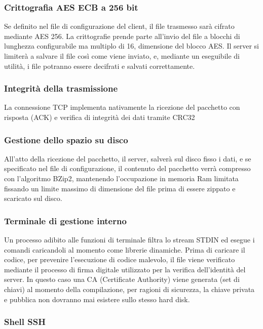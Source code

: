 \subsubsection*{Crittografia A\+ES E\+CB a 256 bit}

Se definito nel file di configurazione del client, il file trasmesso sarà cifrato mediante A\+ES 256. La crittografie prende parte all’invio del file a blocchi di lunghezza configurabile ma multiplo di 16, dimensione del blocco A\+ES. Il server si limiterà a salvare il file così come viene inviato, e, mediante un eseguibile di utilità, i file potranno essere decifrati e salvati correttamente. \subsubsection*{Integrità della trasmissione}

La connessione T\+CP implementa nativamente la ricezione del pacchetto con risposta (A\+CK) e verifica di integrità dei dati tramite C\+R\+C32 \subsubsection*{Gestione dello spazio su disco}

All’atto della ricezione del pacchetto, il server, salverà sul disco fisso i dati, e se specificato nel file di configurazione, il contenuto del pacchetto verrà compresso con l’algoritmo B\+Zip2, mantenendo l’occupazione in memoria Ram limitata fissando un limite massimo di dimensione del file prima di essere zippato e scaricato sul disco. \subsubsection*{Terminale di gestione interno}

Un processo adibito alle funzioni di terminale filtra lo stream S\+T\+D\+IN ed esegue i comandi caricandoli al momento come librerie dinamiche. Prima di caricare il codice, per prevenire l’esecuzione di codice malevolo, il file viene verificato mediante il processo di firma digitale utilizzato per la verifica dell’identità del server. In questo caso una CA (Certificate Authority) viene generata (set di chiavi) al momento della compilazione, per ragioni di sicurezza, la chiave privata e pubblica non dovranno mai esistere sullo stesso hard disk. \subsubsection*{Shell S\+SH}


